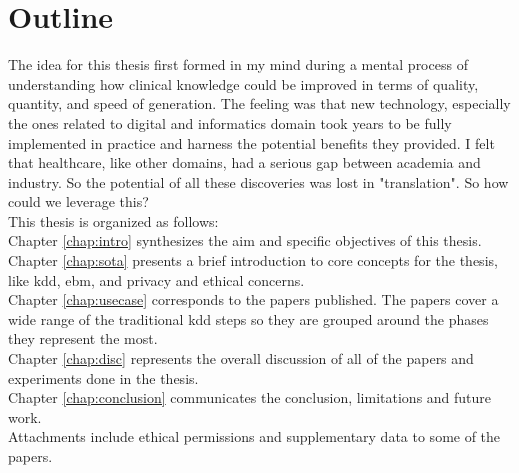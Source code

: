 \chapter*{Outline}


The idea for this thesis first formed in my mind during a mental process of understanding how clinical knowledge could be improved in terms of quality, quantity, and speed of generation. The feeling was that new technology, especially the ones related to digital and informatics domain took years to be fully implemented in practice and harness the potential benefits they provided. I felt that healthcare, like other domains, had a serious gap between academia and industry. So the potential of all these discoveries was lost in "translation".
So how could we leverage this? \\
This thesis is organized as follows:\\
Chapter \ref{chap:intro} synthesizes the aim and specific objectives of this thesis.
Chapter \ref{chap:sota} presents a brief introduction to core concepts for the thesis, like \ac{kdd}, \ac{ebm}, and privacy and ethical concerns.\\
Chapter \ref{chap:usecase} corresponds to the papers published. The papers cover a wide range of the traditional \ac{kdd} steps so they are grouped around the phases they represent the most.\\

Chapter \ref{chap:disc} represents the overall discussion of all of the papers and experiments done in the thesis.\\

Chapter \ref{chap:conclusion} communicates the conclusion, limitations and future work.\\

Attachments include ethical permissions and supplementary data to some of the papers.
